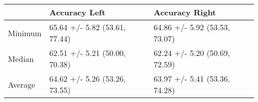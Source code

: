 \begin{tabular}{lll}
\toprule
{} &                  Accuracy Left &                 Accuracy Right \\
\midrule
Minimum &  65.64 +/- 5.82 (53.61, 77.44) &  64.86 +/- 5.92 (53.53, 73.07) \\
Median  &  62.51 +/- 5.21 (50.00, 70.38) &  62.24 +/- 5.20 (50.69, 72.59) \\
Average &  64.62 +/- 5.26 (53.26, 73.55) &  63.97 +/- 5.41 (53.36, 74.28) \\
\bottomrule
\end{tabular}
